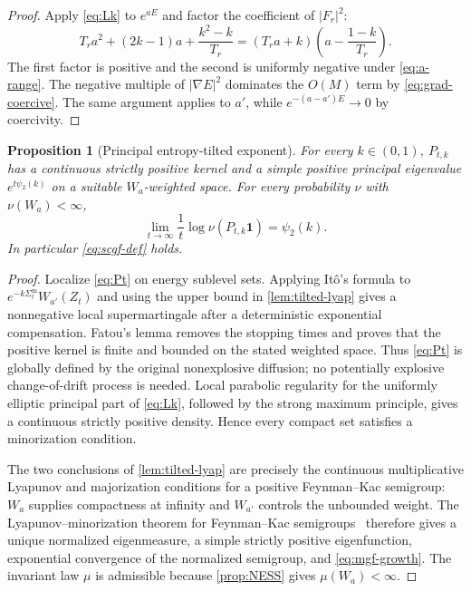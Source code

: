 \documentclass[11pt]{article}
\newtheorem{proposition}[theorem]{Proposition}
\theoremstyle{remark}
\newcommand{\SigmaM}{\Sigma^{\mathrm m}}
\begin{document}
\begin{proof}
Apply \eqref{eq:Lk} to $e^{aE}$ and factor the coefficient of
$|F_r|^2$:
\[
 T_ra^2+(2k-1)a+\frac{k^2-k}{T_r}
 =(T_ra+k)\left(a-\frac{1-k}{T_r}\right).
\]
The first factor is positive and the second is uniformly negative under
\eqref{eq:a-range}.  The negative multiple of $|\nabla E|^2$ dominates the
$O(M)$ term by \eqref{eq:grad-coercive}.  The same argument applies to
$a'$, while $e^{-(a-a')E}\to0$ by coercivity.
\end{proof}

\begin{proposition}[Principal entropy-tilted exponent]\label{prop:principal}
For every $k\in(0,1)$, $P_{t,k}$ has a continuous strictly positive kernel
and a simple positive principal eigenvalue $e^{t\psi_2(k)}$ on a suitable
$W_a$-weighted space.  For every probability $\nu$ with $\nu(W_a)<\infty$,
\begin{equation}\label{eq:mgf-growth}
 \lim_{t\to\infty}\frac1t\log\nu(P_{t,k}\mathbf1)=\psi_2(k).
\end{equation}
In particular \eqref{eq:scgf-def} holds.
\end{proposition}

\begin{proof}
Localize \eqref{eq:Pt} on energy sublevel sets.  Applying It\^o's formula to
$e^{-k\SigmaM_t}W_{a'}(Z_t)$ and using the upper bound in
\cref{lem:tilted-lyap} gives a nonnegative local supermartingale after a
deterministic exponential compensation.  Fatou's lemma removes the stopping
times and proves that the positive kernel is finite and bounded on the stated
weighted space.  Thus \eqref{eq:Pt} is globally defined by the original
nonexplosive diffusion; no potentially explosive change-of-drift process is
needed.  Local parabolic regularity for the uniformly
elliptic principal part of \eqref{eq:Lk}, followed by the strong maximum
principle, gives a continuous strictly positive density.  Hence every compact
set satisfies a minorization condition.

The two conclusions of \cref{lem:tilted-lyap} are precisely the continuous
multiplicative Lyapunov and majorization conditions for a positive
Feynman--Kac semigroup: $W_a$ supplies compactness at infinity and $W_{a'}$
controls the unbounded weight.  The Lyapunov--minorization theorem for
Feynman--Kac semigroups~\cite{FerreRoussetStoltz2021} therefore gives a unique normalized eigenmeasure, a
simple strictly positive eigenfunction, exponential convergence of the
normalized semigroup, and \eqref{eq:mgf-growth}.  The invariant law $\mu$ is
admissible because \cref{prop:NESS} gives $\mu(W_a)<\infty$.
\end{proof}
\end{document}
